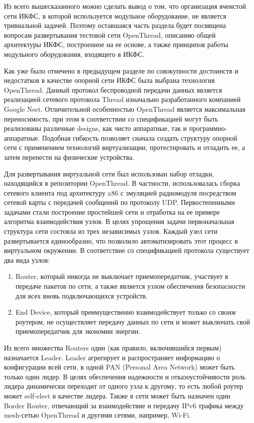 Из всего вышесказанного можно сделать вывод о том, что организация ячеистой сети ИКФС, в которой используется модульное оборудование, не является тривиальной задачей. Поэтому оставшаяся часть раздела будет посвящена вопросам развертывания тестовой сети OpenThread, описанию общей архитектуры ИКФС, построенное на ее основе, а также принципов работы модульного оборудования, входящего в ИКФС.

Как уже было отмечено в предыдущем разделе по совокупности достоинств и недостатков в качестве опорной сети ИКФС была выбрана технология OpenThread. Данный протокол беспроводной передачи данных является реализацией сетевого протокола Thread изначально разработанного компанией Google Nest. Отличительной особенностью OpenThread является максимальная переносимость, при этом в соответствии со спецификацией  могут быть реализованы различные designs, как чисто аппаратные, так и программно-аппаратные. Подобная гибкость позволяет сначала создать структуру опорной сети с применением технологий виртуализации, протестировать и отладить ее, а затем перенести на физические устройства.

Для развертывания виртуальной сети был использован набор отладки, находящийся в репозитории OpenThread. В частности, 	использовалась сборка сетевого клиента под архитектуру x86 с эмуляцией радиомодуля посредством сетевой карты с передачей сообщений по протоколу UDP. Первостепенными задачами стали построение простейшей сети и отработка на ее примере алгоритма взаимодействия узлов. В целях упрощения задачи первоначальная структура сети состояла из трех независимых узлов. Каждый узел сети развертывается единообразно, что позволило автоматизировать этот процесс в виртуальном окружении.
В соответствие со спецификацией протокола существует два вида узлов: 

\begin{enumerate}
	\item Router, который никогда не выключает приемопередатчик, участвует в передаче пакетов по сети, а также является узлом обеспечения безопасности для всех вновь подключающихся устройств.
	\item End Device, который преимущественно взаимодействует только со своим роутером, не осуществляет передачу данных по сети и может выключать свой приемопередатчик для экономии энергии.
\end{enumerate}

Из всего множества Routers один (как правило, включившийся первым) назначается Leader. Leader агрегирует и распространяет информацию о конфигурации всей сети, в одной PAN (Personal Area Network) может быть только один лидер.  В целях обеспечения надежности и отказоустойчивости роль лидера динамически переходит от одного узла к другому, то есть любой роутер может self-elect в качестве лидера. Также в сети может быть назначен один Border Router, отвечающий за взаимодействие и передачу IPv6 трафика между mesh-сетью OpenThread и другими сетями, например, Wi-Fi.

